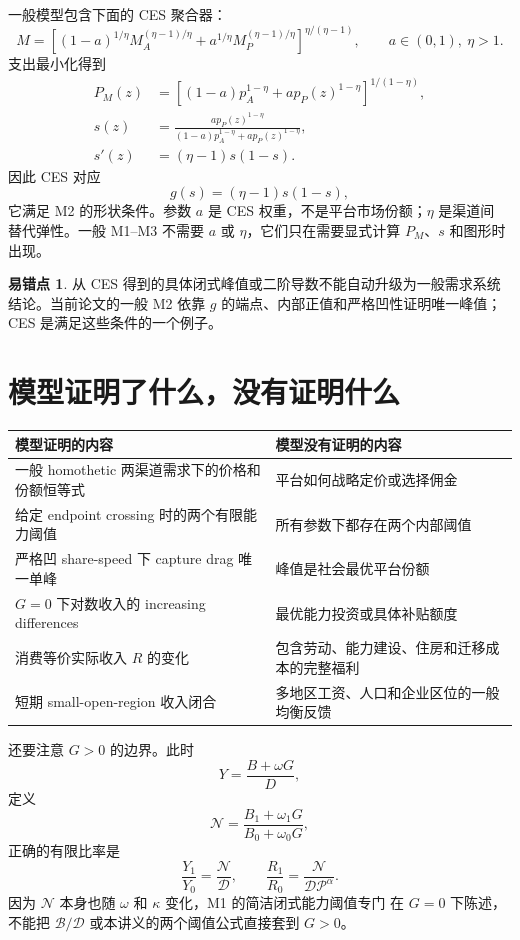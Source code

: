 \documentclass[UTF8,11pt,scheme=chinese,fontset=fandol]{ctexart}
\newcommand{\calB}{\mathcal B}
\newcommand{\calD}{\mathcal D}
\newcommand{\calP}{\mathcal P}
\theoremstyle{definition}
\newtheorem{commonerror}{易错点}[section]
\begin{document}
一般模型包含下面的 CES 聚合器：
\[
M=\left[(1-a)^{1/\eta}M_A^{(\eta-1)/\eta}
+a^{1/\eta}M_P^{(\eta-1)/\eta}\right]^{\eta/(\eta-1)},
\qquad a\in(0,1),\ \eta>1.
\]
支出最小化得到
\begin{align*}
P_M(z)&=\left[(1-a)p_A^{1-\eta}
+ap_P(z)^{1-\eta}\right]^{1/(1-\eta)},\\
s(z)&=\frac{ap_P(z)^{1-\eta}}
{(1-a)p_A^{1-\eta}+ap_P(z)^{1-\eta}},\\
s'(z)&=(\eta-1)s(1-s).
\end{align*}
因此 CES 对应
\[
g(s)=(\eta-1)s(1-s),
\]
它满足 M2 的形状条件。参数 \(a\) 是 CES 权重，不是平台市场份额；\(\eta\) 是渠道间
替代弹性。一般 M1--M3 不需要 \(a\) 或 \(\eta\)，它们只在需要显式计算 \(P_M\)、\(s\)
和图形时出现。

\begin{commonerror}
从 CES 得到的具体闭式峰值或二阶导数不能自动升级为一般需求系统结论。当前论文的一般 M2
依靠 \(g\) 的端点、内部正值和严格凹性证明唯一峰值；CES 是满足这些条件的一个例子。
\end{commonerror}

\section{模型证明了什么，没有证明什么}

\begin{center}
\small
\begin{tabularx}{\textwidth}{X X}
\toprule
模型证明的内容 & 模型没有证明的内容 \\
\midrule
一般 homothetic 两渠道需求下的价格和份额恒等式 & 平台如何战略定价或选择佣金 \\
给定 endpoint crossing 时的两个有限能力阈值 & 所有参数下都存在两个内部阈值 \\
严格凹 share-speed 下 capture drag 唯一单峰 & 峰值是社会最优平台份额 \\
\(G=0\) 下对数收入的 increasing differences & 最优能力投资或具体补贴额度 \\
消费等价实际收入 \(R\) 的变化 & 包含劳动、能力建设、住房和迁移成本的完整福利 \\
短期 small-open-region 收入闭合 & 多地区工资、人口和企业区位的一般均衡反馈 \\
\bottomrule
\end{tabularx}
\end{center}

还要注意 \(G>0\) 的边界。此时
\[
Y=\frac{B+\omega G}{D},
\]
定义
\[
\mathcal N=\frac{B_1+\omega_1G}{B_0+\omega_0G},
\]
正确的有限比率是
\[
\frac{Y_1}{Y_0}=\frac{\mathcal N}{\calD},
\qquad
\frac{R_1}{R_0}=\frac{\mathcal N}{\calD\calP^\alpha}.
\]
因为 \(\mathcal N\) 本身也随 \(\omega\) 和 \(\kappa\) 变化，M1 的简洁闭式能力阈值专门
在 \(G=0\) 下陈述，不能把 \(\calB/\calD\) 或本讲义的两个阈值公式直接套到 \(G>0\)。
\end{document}
